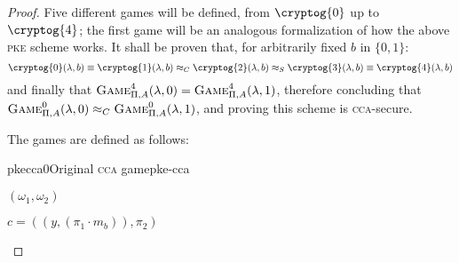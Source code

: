 \begin{proof}
    Five different games will be defined, from $\cryptog{0}$ up to $\cryptog{4}$; the first game will be an analogous formalization of how the above \textsc{pke} scheme works. It shall be proven that, for arbitrarily fixed $b$ in $\{0, 1\}$:
    \[
        \cryptog{0}(\lambda, b) \equiv \cryptog{1}(\lambda, b) \approx_C \cryptog{2}(\lambda, b) \approx_S \cryptog{3}(\lambda, b) \equiv \cryptog{4}(\lambda, b)
    \]
    and finally that $\textsc{Game}_{\Pi, A}^4(\lambda, 0) = \textsc{Game}_{\Pi, A}^4(\lambda, 1)$, therefore concluding that $\textsc{Game}_{\Pi, A}^0(\lambda, 0) \approx_C \textsc{Game}_{\Pi, A}^0(\lambda, 1)$, and proving this scheme is \textsc{cca}-secure.


    The games are defined as follows:

    \begin{cryptogame}{pkecca0}{Original \textsc{cca} game}{pke-cca}
    
        {$(\omega_1, \omega_2)$}
        {}
    
        \send{}{}{}
        \receive{}{}{}
    
        \cseqdelay
    
        {$c = ((y, (\pi_1 \cdot m_b)), \pi_2)$}
        {}
    
        \cseqdelay
    
        \send{}{}{}
        \receive{}{}{}
    
        \cseqdelay
    
    

\end{cryptogame}
\end{proof}
